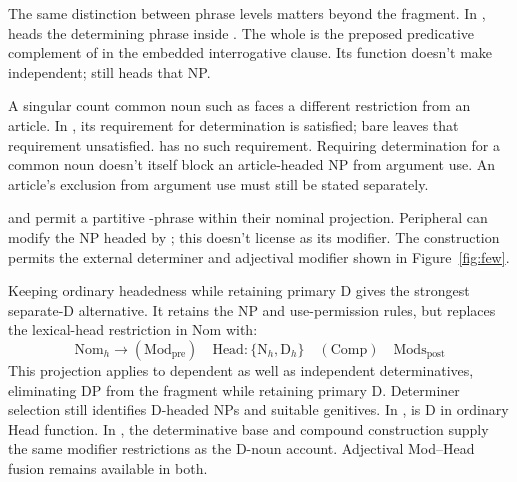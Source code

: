 \documentclass[12pt]{article}
\begin{document}
The same distinction between phrase levels matters beyond the fragment. In ,  heads the determining phrase inside . The whole  is the preposed predicative complement of  in the embedded interrogative clause. Its function doesn't make  independent;  still heads that NP.

A singular count common noun such as  faces a different restriction from an article. In , its requirement for determination is satisfied; bare  leaves that requirement unsatisfied.  has no such requirement. Requiring determination for a common noun doesn't itself block an article-headed NP from argument use. An article's exclusion from argument use must still be stated separately.

 and  permit a partitive -phrase within their nominal projection. Peripheral  can modify the NP headed by ; this doesn't license  as its modifier. The construction  permits the external determiner and adjectival modifier shown in Figure~\ref{fig:few}.

Keeping ordinary headedness while retaining primary D gives the strongest separate-D alternative. It retains the NP and use-permission rules, but replaces the lexical-head restriction in Nom with:
\[
\mathrm{Nom}_{h}\to(\mathrm{Mod}_{\mathrm{pre}})\quad\mathrm{Head}:\{\mathrm{N}_{h},\mathrm{D}_{h}\}\quad(\mathrm{Comp})\quad\mathrm{Mods}_{\mathrm{post}}
\]
This projection applies to dependent as well as independent determinatives, eliminating DP from the fragment while retaining primary D. Determiner selection still identifies D-headed NPs and suitable genitives. In ,  is D in ordinary Head function. In , the determinative base and compound construction supply the same modifier restrictions as the D-noun account. Adjectival Mod--Head fusion remains available in both.
\end{document}
